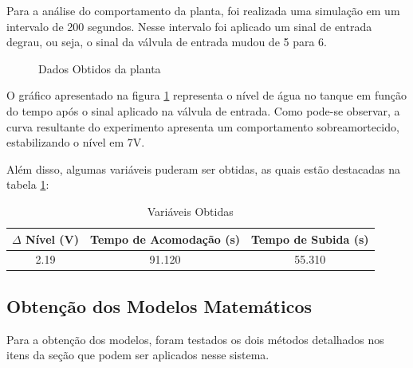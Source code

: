 \documentclass[
	article,			%
	11pt,				%
	oneside,			%
	a4paper,			%
	section=TITLE,		%
	english,			%
	brazil,				%
	sumario=tradicional
	]{abntex2}
\begin{document}
Para a análise do comportamento da planta, foi realizada uma simulação em um intervalo de 200 segundos. Nesse intervalo foi aplicado um sinal de entrada degrau, ou seja, o sinal da válvula de entrada mudou de 5 para 6.
\begin{figure}[H]
    \centering
    \caption{Dados Obtidos da planta}
    \label{fig:dados-planta}
\end{figure}

O gráfico apresentado na figura \ref{fig:dados-planta} representa o nível de água no tanque em função do tempo após o sinal aplicado na válvula de entrada. Como pode-se observar, a curva resultante do experimento apresenta um comportamento sobreamortecido, estabilizando o nível em 7V.

Além disso, algumas variáveis puderam ser obtidas, as quais estão destacadas na tabela \ref{tab:var-obtidas}:

\begin{table}[H]
    \centering
    \begin{tabular}{c|c|c}
        \toprule
        $\Delta$ Nível (V) & Tempo de Acomodação (s) & Tempo de Subida (s)\\
        \midrule
        2.19 & 91.120 & 55.310 \\
        \bottomrule
    \end{tabular}
    \caption{Variáveis Obtidas}
    \label{tab:var-obtidas}
\end{table}

\subsection{Obtenção dos Modelos Matemáticos}

Para a obtenção dos modelos, foram testados os dois métodos detalhados nos itens da seção \label{sec:metodo-modelos} que podem ser aplicados nesse sistema.
\end{document}
